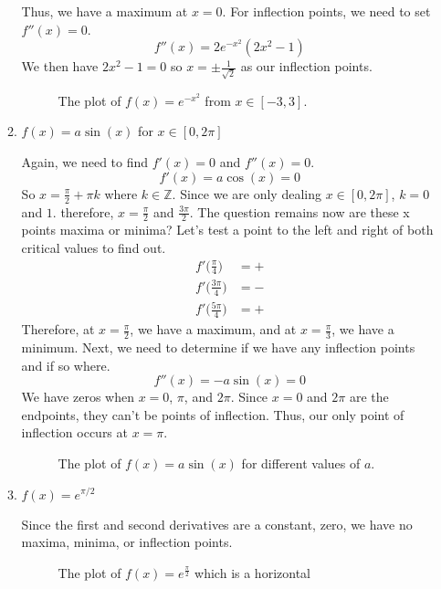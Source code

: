 \begin{enumerate}
\begin{enumerate}[label = (\alph*)]
    Thus, we have a maximum at \(x = 0\).
    For inflection points, we need to set \(f''(x) = 0\).
    \[
    f''(x) = 2e^{-x^2}(2x^2 - 1)
    \]
    We then have \(2x^2 - 1 = 0\) so \(x = \pm\frac{1}{\sqrt{2}}\) as our
    inflection points.
    \begin{figure}[H]
      \centering
      
      \caption{The plot of \(f(x) = e^{-x^2}\) from \(x\in[-3, 3]\).}
    \end{figure}
  \item
    \(f(x) = a\sin(x)\) for \(x\in[0, 2\pi]\)
    \par\smallskip
    Again, we need to find \(f'(x) = 0\) and \(f''(x) = 0\).
    \[
    f'(x) = a\cos(x) = 0
    \]
    So \(x = \frac{\pi}{2} + \pi k\) where \(k\in\mathbb{Z}\).
    Since we are only dealing \(x\in[0, 2\pi]\), \(k = 0\) and \(1\).
    therefore, \(x = \frac{\pi}{2}\) and \(\frac{3\pi}{2}\).
    The question remains now are these x points maxima or minima?
    Let's test a point to the left and right of both critical values to find out.
    \begin{align*}
      f'\big(\frac{\pi}{4}\big) &= +\\
      f'\big(\frac{3\pi}{4}\big) &= -\\
      f'\big(\frac{5\pi}{4}\big) &= +
    \end{align*}
    Therefore, at \(x = \frac{\pi}{2}\), we have a maximum, and at
    \(x = \frac{\pi}{3}\), we have a minimum.
    Next, we need to determine if we have any inflection points and if so
    where.
    \[
    f''(x) = -a\sin(x) = 0
    \]
    We have zeros when \(x = 0\), \(\pi\), and \(2\pi\).
    Since \(x = 0\) and \(2\pi\) are the endpoints, they can't be points of
    inflection.
    Thus, our only point of inflection occurs at \(x = \pi\).
    \begin{figure}[H]
      \centering
      
      \caption{The plot of \(f(x) = a\sin(x)\) for different values of \(a\).}
    \end{figure}
  \item
    \(f(x) = e^{\pi/2}\)
    \par\smallskip
    Since the first and second derivatives are a constant, zero, we have no
    maxima, minima, or inflection points.
    \begin{figure}[H]
      \centering
      
      \caption{The plot of \(f(x) = e^{\frac{\pi}{2}}\) which is a horizontal
}
\end{figure}
\end{enumerate}
\end{enumerate}
